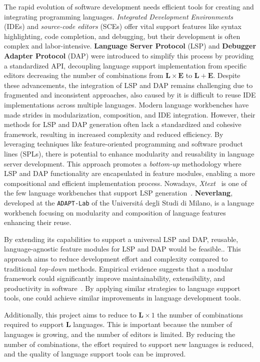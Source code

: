 The rapid evolution of software development needs efficient tools for creating and integrating programming languages. \textit{Integrated Development Environments} (IDEs) and \textit{source-code editors} (SCEs) offer vital support features like syntax highlighting, code completion, and debugging, but their development is often complex and labor-intensive. \textbf{Language Server Protocol} (LSP) and \textbf{Debugger Adapter Protocol} (DAP) were introduced to simplify this process by providing a standardized API, decoupling language support implementation from specific editors decreasing the number of combinations from $\mathbf{L} \times \mathbf{E}$ to $\mathbf{L} + \mathbf{E}$. Despite these advancements, the integration of LSP and DAP remains challenging due to fragmented and inconsistent approaches, also caused by it is difficult to reuse IDE implementations across multiple languages. Modern language workbenches have made strides in modularization, composition, and IDE integration. However, their methods for LSP and DAP generation often lack a standardized and cohesive framework, resulting in increased complexity and reduced efficiency. By leveraging techniques like feature-oriented programming and software product lines (SPLs), there is potential to enhance modularity and reusability in language server development. This approach promotes a \textit{bottom-up} methodology where LSP and DAP functionality are encapsulated in feature modules, enabling a more compositional and efficient implementation process. Nowadays, \textit{Xtext}~\cite{Bettini13b} is one of the few language workbenches that support LSP generation~\cite{Barros22}. \textbf{Neverlang}, developed at the \texttt{ADAPT-Lab} of the Universit\'a degli Studi di Milano, is a language workbench focusing on modularity and composition of language features enhancing their reuse.

By extending its capabilities to support a universal LSP and DAP, reusable, language-agnostic feature modules for LSP and DAP would be feasible.. This approach aims to reduce development effort and complexity compared to traditional \textit{top-down} methods. Empirical evidence suggests that a modular framework could significantly improve maintainability, extensibility, and productivity in software~\cite{Sun17}. By applying similar strategies to language support tools, one could achieve similar improvements in language development tools.

Additionally, this project aims to reduce to $\mathbf{L} \times 1$ the number of combinations required to support $\mathbf{L}$ languages. This is important because the number of languages is growing, and the number of editors is limited. By reducing the number of combinations, the effort required to support new languages is reduced, and the quality of language support tools can be improved.
